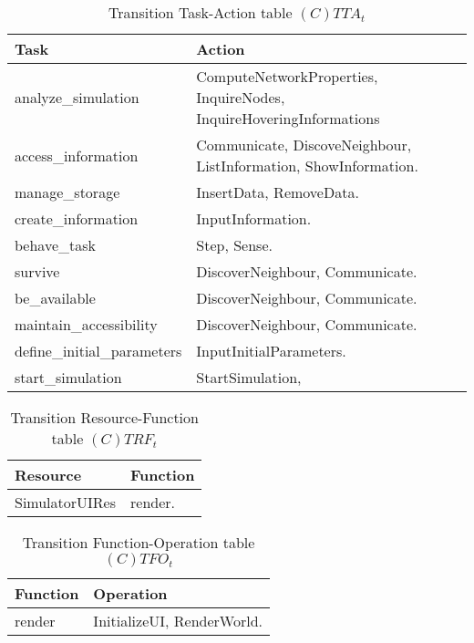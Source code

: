 \begin{table}[H]
	\centering
	\begin{tabular}{|p{4cm}|p{8cm}|}
			\hline
			\textbf{Task} & \textbf{Action} \\
			\hline
			analyze\_simulation & ComputeNetworkProperties, InquireNodes,
			InquireHoveringInformations \\
			\hline
			access\_information & Communicate, DiscoveNeighbour,
			ListInformation, ShowInformation.\\
			\hline
			manage\_storage & InsertData, RemoveData. \\
			\hline
			create\_information & InputInformation. \\
			\hline
			behave\_task & Step, Sense. \\
			\hline
			survive & DiscoverNeighbour, Communicate. \\
			\hline
			be\_available & DiscoverNeighbour, Communicate. \\
			\hline
			maintain\_accessibility & DiscoverNeighbour, Communicate. \\
			\hline
			define\_initial\_parameters & InputInitialParameters. \\
			\hline
			start\_simulation & StartSimulation, \\
			\hline
		\end{tabular}
	\caption{Transition Task-Action table $(C)TTA_t$}
	\label{tab:cttat}
\end{table}

\begin{table}[H]
	\centering
	\begin{tabular}{|p{4cm}|p{8cm}|}
			\hline
			\textbf{Resource} & \textbf{Function} \\
			\hline
			SimulatorUIRes & render. \\
			\hline
		\end{tabular}
	\caption{Transition Resource-Function table $(C)TRF_t$}
	\label{tab:ctrft}
\end{table}

\begin{table}[H]
	\centering
	\begin{tabular}{|p{4cm}|p{8cm}|}
			\hline
			\textbf{Function} & \textbf{Operation} \\
			\hline
			render & InitializeUI, RenderWorld. \\
			\hline
		\end{tabular}
	\caption{Transition Function-Operation table $(C)TFO_t$}
	\label{tab:ctfot}
\end{table}

